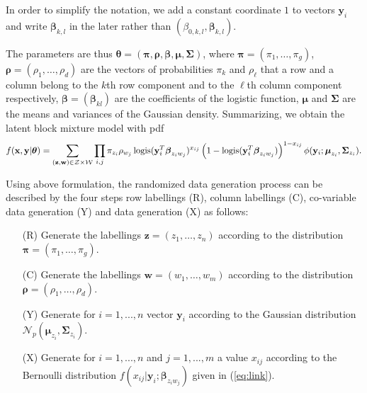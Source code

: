 \documentclass[a4paper]{article}
\DeclareMathOperator{\logis}{logis}
\newcommand{\calW}{{\cal W}}
\newcommand{\calZ}{{\cal Z}}
\newcommand{\bw}{\mathbf{w}}
\newcommand{\bx}{\mathbf{x}}
\newcommand{\by}{\mathbf{y}}
\newcommand{\bz}{\mathbf{z}}
\newcommand{\bbeta}{\boldsymbol{\beta}}
\newcommand{\bmu}{\boldsymbol{\mu}}
\newcommand{\bpi}{\boldsymbol{\pi}}
\newcommand{\brho}{\boldsymbol{\rho}}
\newcommand{\bSigma}{\boldsymbol{\Sigma}}
\newcommand{\btheta}{\boldsymbol{\theta}}
\begin{document}
In order to simplify the notation, we add a constant coordinate $1$ to vectors $\by_i$
and write $\bbeta_{k,l}$ in the later rather than $(\beta_{0,k,l},\bbeta_{k,l})$.

The parameters are thus $\btheta=(\bpi,\brho,\bbeta,\bmu,\bSigma)$, where
$\bpi=(\pi_1,\ldots,\pi_g)$, $\brho=(\rho_1,\ldots,\rho_d)$ are the vectors
of probabilities $\pi_k$ and $\rho_\ell$ that a row and a column belong to
the $k$th row component and to the $\ell$th column component respectively,
$\bbeta=(\bbeta_{kl})$ are the coefficients of the logistic function,
$\bmu$ and $\bSigma$ are the means and variances of the
Gaussian density. Summarizing, we obtain the latent block mixture model
with pdf
\begin{equation}
  \label{eq:latent_block_model_1}
  f(\bx,\by|\btheta)=\sum_{(\bz,\bw) \in \calZ \times \calW}
  \prod_{i,j} \pi_{z_i} \rho_{w_j} \logis(\by_i^T\bbeta_{z_i w_j})^{x_{ij}}
  \left(1-\logis(\by_i^T\bbeta_{z_i w_j})\right)^{1-x_{ij}}
  \phi(\by_i;\bmu_{z_{i}},\bSigma_{z_{i}}).
\end{equation}

Using above formulation, the randomized data generation process can be described by the four steps row labellings (R), column labellings (C), co-variable data generation (Y) and data generation (X) as follows:
\begin{enumerate}
\item[(R)] Generate the labellings $\bz=(z_1,\ldots,z_n)$ according to the
  distribution $\bpi=(\pi_1,\ldots,\pi_g)$.
\item[(C)] Generate the labellings $\bw=(w_1,\ldots,w_m)$ according to the
distribution $\brho=(\rho_1,\ldots,\rho_d)$.
\item[(Y)] Generate for $i=1,...,n$  vector $\by_{i}$ according to
the Gaussian distribution $\mathcal{N}_p(\bmu_{z_{i}},\bSigma_{z_{i}})$.
\item[(X)] Generate for $i=1,...,n$ and $j=1,...,m$ a value $x_{ij}$ according to the Bernoulli distribution $f(x_{ij}|\by_i;\bbeta_{z_i w_j})$
given in (\ref{eq:link}).
\end{enumerate}
\end{document}
